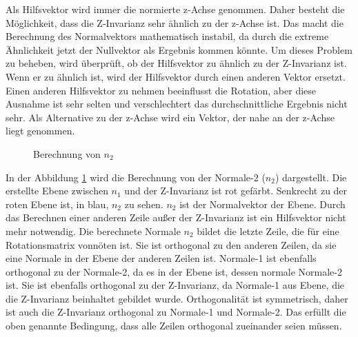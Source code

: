 \smallskip

Als Hilfsvektor wird immer die normierte z-Achse genommen. Daher besteht die Möglichkeit, dass die Z-Invarianz sehr ähnlich zu der z-Achse ist. Das macht die Berechnung des Normalvektors mathematisch instabil, da durch die extreme Ähnlichkeit jetzt der Nullvektor als Ergebnis kommen könnte. 
Um dieses Problem zu beheben, wird überprüft, ob der Hilfsvektor zu ähnlich zu der Z-Invarianz ist. Wenn er zu ähnlich ist, wird der Hilfsvektor durch einen anderen Vektor ersetzt. Einen anderen Hilfsvektor zu nehmen beeinflusst die Rotation, aber diese Ausnahme ist sehr selten und verschlechtert das durchschnittliche Ergebnis nicht sehr.
Als Alternative zu der z-Achse wird ein Vektor, der nahe an der z-Achse liegt genommen.

    
    \begin{figure}[t]
        \centering
        \caption[Berechnung von $n_2$]{Berechnung von $n_2$}
            \label{n2}
    \end{figure}

In der Abbildung \ref{n2} wird die Berechnung von der Normale-2 ($n_2$) dargestellt. Die erstellte Ebene zwischen $n_1$ und der Z-Invarianz ist rot gefärbt. Senkrecht zu der roten Ebene ist, in blau, $n_2$ zu sehen. $n_2$ ist der Normalvektor der Ebene. 
Durch das Berechnen einer anderen Zeile außer der Z-Invarianz ist ein Hilfsvektor nicht mehr notwendig. Die berechnete Normale $n_2$ bildet die letzte Zeile, die für eine Rotationsmatrix vonnöten ist. Sie ist orthogonal zu den anderen Zeilen, da sie eine Normale in der Ebene der anderen Zeilen ist.
Normale-1 ist ebenfalls orthogonal zu der Normale-2, da es in der Ebene ist, dessen normale Normale-2 ist. Sie ist ebenfalls orthogonal zu der Z-Invarianz, da Normale-1 aus Ebene, die die Z-Invarianz beinhaltet gebildet wurde. 
Orthogonalität ist symmetrisch, daher ist auch die Z-Invarianz orthogonal zu Normale-1 und Normale-2. Das erfüllt die oben genannte Bedingung, dass alle Zeilen orthogonal zueinander seien müssen.



